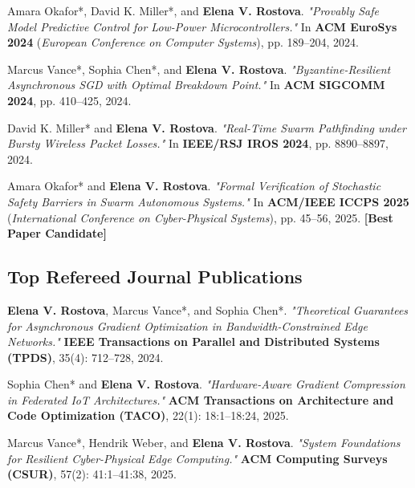 \documentclass[11pt, a4paper, parskip=half]{scrartcl}
\begin{document}
\begin{enumerate}[label={\sffamily\bfseries [C\arabic*]}]
  \item Amara Okafor*, David K. Miller*, and \textbf{Elena V. Rostova}. \textit{"Provably Safe Model Predictive Control for Low-Power Microcontrollers."} In \textbf{ACM EuroSys 2024} (\textit{European Conference on Computer Systems}), pp. 189--204, 2024.

  \item Marcus Vance*, Sophia Chen*, and \textbf{Elena V. Rostova}. \textit{"Byzantine-Resilient Asynchronous SGD with Optimal Breakdown Point."} In \textbf{ACM SIGCOMM 2024}, pp. 410--425, 2024.

  \item David K. Miller* and \textbf{Elena V. Rostova}. \textit{"Real-Time Swarm Pathfinding under Bursty Wireless Packet Losses."} In \textbf{IEEE/RSJ IROS 2024}, pp. 8890--8897, 2024.

  \item Amara Okafor* and \textbf{Elena V. Rostova}. \textit{"Formal Verification of Stochastic Safety Barriers in Swarm Autonomous Systems."} In \textbf{ACM/IEEE ICCPS 2025} (\textit{International Conference on Cyber-Physical Systems}), pp. 45--56, 2025. \textcolor{SecondaryTeal}{\textbf{[Best Paper Candidate]}}
\end{enumerate}

\subsection{Top Refereed Journal Publications}

\begin{enumerate}[label={\sffamily\bfseries [J\arabic*]}]
  \item \textbf{Elena V. Rostova}, Marcus Vance*, and Sophia Chen*. \textit{"Theoretical Guarantees for Asynchronous Gradient Optimization in Bandwidth-Constrained Edge Networks."} \textbf{IEEE Transactions on Parallel and Distributed Systems (TPDS)}, 35(4): 712--728, 2024.

  \item Sophia Chen* and \textbf{Elena V. Rostova}. \textit{"Hardware-Aware Gradient Compression in Federated IoT Architectures."} \textbf{ACM Transactions on Architecture and Code Optimization (TACO)}, 22(1): 18:1--18:24, 2025.

  \item Marcus Vance*, Hendrik Weber, and \textbf{Elena V. Rostova}. \textit{"System Foundations for Resilient Cyber-Physical Edge Computing."} \textbf{ACM Computing Surveys (CSUR)}, 57(2): 41:1--41:38, 2025.
\end{enumerate}
\end{document}
